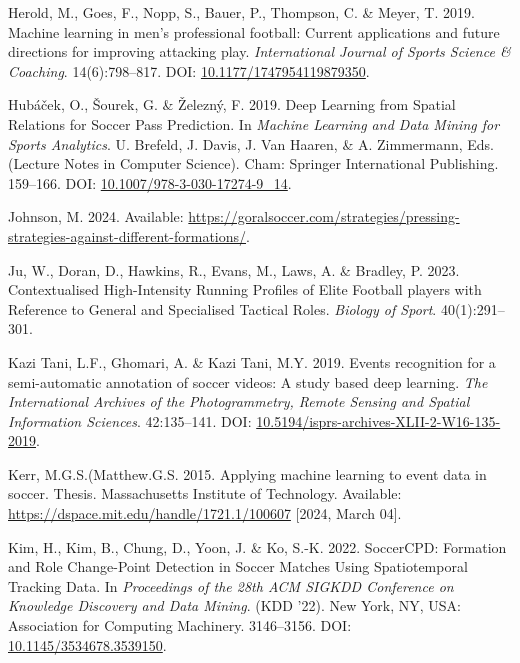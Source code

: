 \documentclass[
  a4paper,
  twoside]{uoe-thesis-template}
\newlength{\cslhangindent}
\newenvironment{CSLReferences}[2] %
 {\begin{list}{}{%
  \setlength{\itemindent}{0pt}
  \setlength{\leftmargin}{0pt}
  \setlength{\parsep}{0pt}
  \ifodd #1
   \setlength{\leftmargin}{\cslhangindent}
   \setlength{\itemindent}{-1\cslhangindent}
  \fi
  \setlength{\itemsep}{#2\baselineskip}}}
 {\end{list}}
\begin{document}
\begin{CSLReferences}{0}{0}
Herold, M., Goes, F., Nopp, S., Bauer, P., Thompson, C. \& Meyer, T.
2019. Machine learning in men's professional football: {Current}
applications and future directions for improving attacking play.
\emph{International Journal of Sports Science \& Coaching}.
14(6):798--817. DOI:
\href{https://doi.org/10.1177/1747954119879350}{10.1177/1747954119879350}.

Hubáček, O., Šourek, G. \& Železný, F. 2019. Deep {Learning} from
{Spatial} {Relations} for {Soccer} {Pass} {Prediction}. In \emph{Machine
{Learning} and {Data} {Mining} for {Sports} {Analytics}}. U. Brefeld, J.
Davis, J. Van Haaren, \& A. Zimmermann, Eds. (Lecture {Notes} in
{Computer} {Science}). Cham: Springer International Publishing.
159--166. DOI:
\href{https://doi.org/10.1007/978-3-030-17274-9_14}{10.1007/978-3-030-17274-9\_14}.

Johnson, M. 2024. Available:
\url{https://goralsoccer.com/strategies/pressing-strategies-against-different-formations/}.

Ju, W., Doran, D., Hawkins, R., Evans, M., Laws, A. \& Bradley, P. 2023.
Contextualised {High}-{Intensity} {Running} {Profiles} of {Elite}
{Football} players with {Reference} to {General} and {Specialised}
{Tactical} {Roles}. \emph{Biology of Sport}. 40(1):291--301.

Kazi Tani, L.F., Ghomari, A. \& Kazi Tani, M.Y. 2019. Events recognition
for a semi-automatic annotation of soccer videos: A study based deep
learning. \emph{The International Archives of the Photogrammetry, Remote
Sensing and Spatial Information Sciences}. 42:135--141. DOI:
\href{https://doi.org/10.5194/isprs-archives-XLII-2-W16-135-2019}{10.5194/isprs-archives-XLII-2-W16-135-2019}.

Kerr, M.G.S.(Matthew.G.S. 2015. Applying machine learning to event data
in soccer. Thesis. Massachusetts Institute of Technology. Available:
\url{https://dspace.mit.edu/handle/1721.1/100607} {[}2024, March 04{]}.

Kim, H., Kim, B., Chung, D., Yoon, J. \& Ko, S.-K. 2022. {SoccerCPD}:
{Formation} and {Role} {Change}-{Point} {Detection} in {Soccer}
{Matches} {Using} {Spatiotemporal} {Tracking} {Data}. In
\emph{Proceedings of the 28th {ACM} {SIGKDD} {Conference} on {Knowledge}
{Discovery} and {Data} {Mining}}. ({KDD} '22). New York, NY, USA:
Association for Computing Machinery. 3146--3156. DOI:
\href{https://doi.org/10.1145/3534678.3539150}{10.1145/3534678.3539150}.


\end{CSLReferences}
\end{document}
